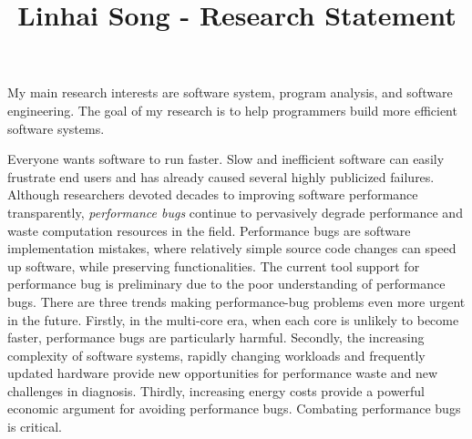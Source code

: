 \documentclass[10pt]{article}
\title{\vspace{-.7in}\bf{Linhai Song - Research Statement\vspace{-.4in}}}
\date{}
\begin{document}
\maketitle\vspace{-.2in}

My main research interests are software system, program analysis, and software engineering. 
The goal of my research is to help programmers build more efficient software systems.

Everyone wants software to run faster. 
Slow and inefficient software can easily frustrate end users and has already caused several highly publicized failures. 
Although researchers devoted decades to improving software performance transparently, 
\textit{performance bugs} continue to pervasively degrade performance and waste computation resources in the field.
Performance bugs are software implementation mistakes, 
where relatively simple source code changes can speed up software, while preserving functionalities. 
The current tool support for performance bug is preliminary due to the poor understanding of performance bugs. 
There are three trends making performance-bug problems even more urgent in the future.
Firstly, in the multi-core era, when each core is unlikely to become faster, performance bugs are particularly harmful.
Secondly, the increasing complexity of software systems, 
rapidly changing workloads and frequently updated hardware provide new opportunities for performance waste and new challenges in diagnosis.
Thirdly, increasing energy costs provide a powerful economic argument for avoiding performance bugs. 
Combating performance bugs is critical.
\end{document}
